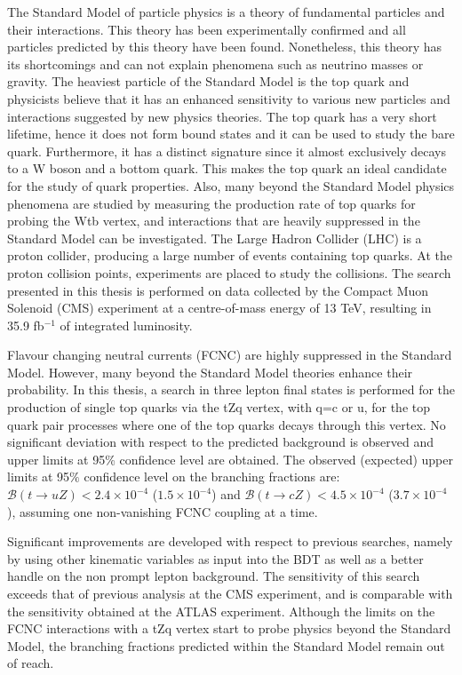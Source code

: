 The Standard Model of particle physics is a theory of fundamental particles and their interactions. This theory has been experimentally confirmed and all particles predicted by this theory have been found. Nonetheless, this theory has its shortcomings and can not explain phenomena such as neutrino masses or gravity. The heaviest particle of the Standard Model is the top quark and physicists believe that it has an enhanced sensitivity to various new particles and interactions suggested by new physics theories. The top quark has a very short lifetime, hence it does not form bound states and it can be used to study the bare quark. Furthermore, it has a distinct signature since it almost exclusively decays to a W boson and a bottom quark. This makes the top quark an ideal candidate for the study of quark properties. Also, many beyond the Standard Model physics phenomena are studied by measuring the production rate of top quarks for probing the Wtb vertex, and interactions that are heavily suppressed in the Standard Model can be investigated. The Large Hadron Collider (LHC) is a proton collider, producing a large number of events containing top quarks. At the proton collision points, experiments are placed to study the collisions. The search presented in this thesis is performed on data collected by the Compact Muon Solenoid (CMS) experiment at a centre-of-mass energy of 13 TeV, resulting in 35.9 fb$^{-1}$ of integrated luminosity. 


Flavour changing neutral currents (FCNC) are highly suppressed in the Standard Model. However, many beyond the Standard Model theories enhance their probability. In this thesis, a search in three lepton final states is performed for the production of single top quarks via the tZq vertex, with q=c or u, for the top quark pair processes where one of the top quarks decays through this vertex.  No significant deviation with respect to the predicted background is observed and upper limits at 95\% confidence level are obtained. The observed (expected) upper limits at 95$\%$ confidence level  on the branching fractions are: ${\mathcal{B}}(t \rightarrow uZ) < 2.4\times 10^{-4}$ ($1.5 \times 10^{-4}$) and ${\mathcal{B}}(t \rightarrow cZ) < 4.5\times 10^{-4}$ ($3.7\times 10^{-4}$), assuming one non-vanishing FCNC coupling at a time. 


Significant improvements are developed with respect to previous searches, namely by using other kinematic variables as input into the BDT as well as a better handle on the non prompt lepton background.  The sensitivity of this search exceeds that of previous analysis at the CMS experiment, and is comparable with the sensitivity obtained at the ATLAS experiment. Although the limits on the FCNC interactions with a tZq vertex start to probe physics beyond the Standard Model, the branching fractions predicted within the Standard Model remain out of reach. 